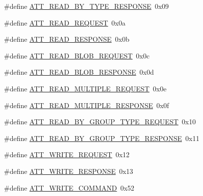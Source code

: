 \begin{DoxyCompactItemize}
\item 
\#define \hyperlink{group___b_l_e___a_t_t___o_p_c_o_d_e_s_ga372091950304562776498f23ac69a50e}{A\+T\+T\+\_\+\+R\+E\+A\+D\+\_\+\+B\+Y\+\_\+\+T\+Y\+P\+E\+\_\+\+R\+E\+S\+P\+O\+N\+SE}~0x09
\item 
\#define \hyperlink{group___b_l_e___a_t_t___o_p_c_o_d_e_s_ga1a8358ca0ffac89c9c2707596540abc5}{A\+T\+T\+\_\+\+R\+E\+A\+D\+\_\+\+R\+E\+Q\+U\+E\+ST}~0x0a
\item 
\#define \hyperlink{group___b_l_e___a_t_t___o_p_c_o_d_e_s_ga8e7d3b1b98a988b038f4c3ae4a6b9c2e}{A\+T\+T\+\_\+\+R\+E\+A\+D\+\_\+\+R\+E\+S\+P\+O\+N\+SE}~0x0b
\item 
\#define \hyperlink{group___b_l_e___a_t_t___o_p_c_o_d_e_s_ga8141e5d19bf569ea663a9ef39c335199}{A\+T\+T\+\_\+\+R\+E\+A\+D\+\_\+\+B\+L\+O\+B\+\_\+\+R\+E\+Q\+U\+E\+ST}~0x0c
\item 
\#define \hyperlink{group___b_l_e___a_t_t___o_p_c_o_d_e_s_ga5ad1b8c2186eaab0d58b077ba0554d0a}{A\+T\+T\+\_\+\+R\+E\+A\+D\+\_\+\+B\+L\+O\+B\+\_\+\+R\+E\+S\+P\+O\+N\+SE}~0x0d
\item 
\#define \hyperlink{group___b_l_e___a_t_t___o_p_c_o_d_e_s_ga40555dd282367207edca14218c872f96}{A\+T\+T\+\_\+\+R\+E\+A\+D\+\_\+\+M\+U\+L\+T\+I\+P\+L\+E\+\_\+\+R\+E\+Q\+U\+E\+ST}~0x0e
\item 
\#define \hyperlink{group___b_l_e___a_t_t___o_p_c_o_d_e_s_ga35477f969251d671b9249e46938cda0a}{A\+T\+T\+\_\+\+R\+E\+A\+D\+\_\+\+M\+U\+L\+T\+I\+P\+L\+E\+\_\+\+R\+E\+S\+P\+O\+N\+SE}~0x0f
\item 
\#define \hyperlink{group___b_l_e___a_t_t___o_p_c_o_d_e_s_ga1694a7cd4468c304fcbdbdb78d84435d}{A\+T\+T\+\_\+\+R\+E\+A\+D\+\_\+\+B\+Y\+\_\+\+G\+R\+O\+U\+P\+\_\+\+T\+Y\+P\+E\+\_\+\+R\+E\+Q\+U\+E\+ST}~0x10
\item 
\#define \hyperlink{group___b_l_e___a_t_t___o_p_c_o_d_e_s_ga3bf3604ca43855a2ccd95749fa3ff0f5}{A\+T\+T\+\_\+\+R\+E\+A\+D\+\_\+\+B\+Y\+\_\+\+G\+R\+O\+U\+P\+\_\+\+T\+Y\+P\+E\+\_\+\+R\+E\+S\+P\+O\+N\+SE}~0x11
\item 
\#define \hyperlink{group___b_l_e___a_t_t___o_p_c_o_d_e_s_gae988e6a82198b028cc06e3fad4305440}{A\+T\+T\+\_\+\+W\+R\+I\+T\+E\+\_\+\+R\+E\+Q\+U\+E\+ST}~0x12
\item 
\#define \hyperlink{group___b_l_e___a_t_t___o_p_c_o_d_e_s_ga589b4c548644f26a0d21c2353854a524}{A\+T\+T\+\_\+\+W\+R\+I\+T\+E\+\_\+\+R\+E\+S\+P\+O\+N\+SE}~0x13
\item 
\#define \hyperlink{group___b_l_e___a_t_t___o_p_c_o_d_e_s_ga270167dee1ec7a9c06fb7f2badbdd1a7}{A\+T\+T\+\_\+\+W\+R\+I\+T\+E\+\_\+\+C\+O\+M\+M\+A\+ND}~0x52

\end{DoxyCompactItemize}
